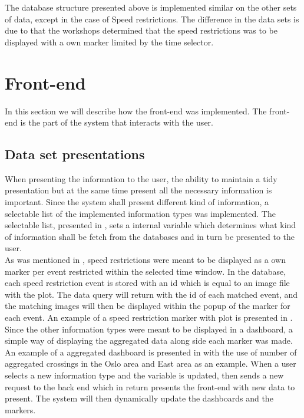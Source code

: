The database structure presented above is implemented similar on the other 
sets of data, except in the case of Speed restrictions. The difference in the
data sets is due to that the workshops determined that the speed restrictions
was to be displayed with a own marker limited by the time selector.


\section{Front-end} %
\label{sec:front_end}
In this section we will describe how the front-end was implemented. The
front-end is the part of the system that interacts with the user.

\subsection{Data set presentations} %
\label{sub:front_end_data_set_presentation}
When presenting the information to the user, the ability to maintain a tidy
presentation but at the same time present all the necessary information is 
important. Since the system shall present different kind of information, a 
selectable list of the implemented information types was implemented. The 
selectable list, presented in , sets a 
internal variable which determines what kind of information shall be fetch 
from the databases and in turn be presented to the user.\\

As was mentioned in , speed restrictions were
meant to be displayed as a own marker per event restricted within the selected
time window. In the database, each speed restriction event is stored with an id
which is equal to an image file with the plot. The data query will return with 
the id of each matched event, and the matching images will then be displayed
within the popup of the marker for each event. An example of a speed 
restriction marker with plot is presented in .\\


Since the other information types were meant to be displayed in a dashboard, a
simple way of displaying the aggregated data along side each marker was made.
An example of a aggregated dashboard is presented in  with the use of number of aggregated crossings in the Oslo area and East area as an example. When a user selects a new information type and the variable is updated, then sends a new request to the back end which in return presents the front-end with new data to present. The system will then dynamically update the dashboards and the markers.

